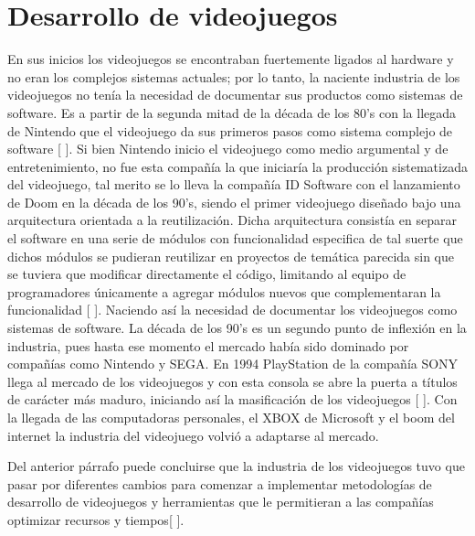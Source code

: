 \section{Desarrollo de videojuegos}
	En sus inicios los videojuegos se encontraban fuertemente ligados al hardware y no eran los complejos sistemas actuales; por lo tanto, la naciente industria de los videojuegos no tenía la necesidad de documentar sus productos como sistemas de software. Es a partir de la segunda mitad de la década de los 80’s con la llegada de Nintendo que el videojuego da sus primeros pasos como sistema complejo de software [ ]. Si bien Nintendo inicio el videojuego como medio argumental y de entretenimiento, no fue esta compañía la que iniciaría la producción sistematizada del videojuego, tal merito se lo lleva la compañía ID Software con el lanzamiento de Doom en la década de los 90’s, siendo el primer videojuego diseñado bajo una arquitectura orientada a la reutilización. Dicha arquitectura consistía en separar el software en una serie de módulos con funcionalidad especifica de tal suerte que dichos módulos se pudieran reutilizar en proyectos de temática parecida sin que se tuviera que modificar directamente el código, limitando al equipo de programadores únicamente a agregar módulos nuevos que complementaran la funcionalidad [ ]. Naciendo así la necesidad de documentar los videojuegos como sistemas de software. La década de los 90’s es un segundo punto de inflexión en la industria, pues hasta ese momento el mercado había sido dominado por compañías como Nintendo y SEGA. En 1994 PlayStation de la compañía SONY llega al mercado de los videojuegos y con esta consola se abre la puerta a títulos de carácter más maduro, iniciando así la masificación de los videojuegos [ ]. Con la llegada de las computadoras personales, el XBOX de Microsoft y el boom del internet la industria del videojuego volvió a adaptarse al mercado. 
\\
\par
Del anterior párrafo puede concluirse que la industria de los videojuegos tuvo que pasar por diferentes cambios para comenzar a implementar metodologías de desarrollo de videojuegos y herramientas que le permitieran a las compañías optimizar recursos y tiempos[ ]. 



